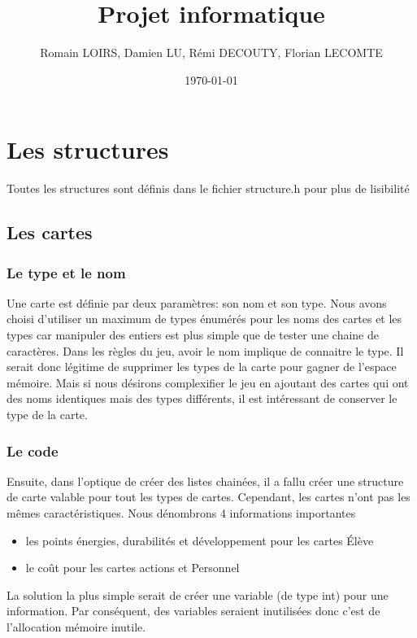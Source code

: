 \documentclass[11pt]{article}
\title{Projet informatique}
\author{Romain LOIRS, Damien LU, Rémi DECOUTY, Florian LECOMTE}
\date{\today}
\begin{document}
\maketitle

\tableofcontents

\newpage

\section{Les structures}

Toutes les structures sont définis dans le fichier structure.h pour plus de lisibilité

\subsection{Les cartes}

\subsubsection{Le type et le nom}

Une carte est définie par deux paramètres: son nom et son type. Nous avons choisi d'utiliser un maximum de types énumérés pour les noms des cartes et les types car manipuler des entiers est plus simple que de tester une chaine de caractères. Dans les règles du jeu, avoir le nom implique de connaitre le type. Il serait donc légitime de supprimer les types de la carte pour gagner de l'espace mémoire. Mais si nous désirons complexifier le jeu en ajoutant des cartes qui ont des noms identiques mais des types différents, il est intéressant de conserver le type de la carte.
 
\subsubsection{Le code}

Ensuite, dans l'optique de créer des listes chainées, il a fallu créer une structure de carte valable pour tout les types de cartes. Cependant, les cartes n'ont pas les mêmes caractéristiques. Nous dénombrons 4 informations importantes 
 \begin{itemize}
 	\item les points énergies, durabilités et développement pour les cartes Élève
 	\item le coût pour les cartes actions et Personnel
 \end{itemize}
La solution la plus simple serait de créer une  variable (de type int) pour une information. Par conséquent, des variables seraient inutilisées donc c'est de l'allocation mémoire inutile.
 
\end{document}
